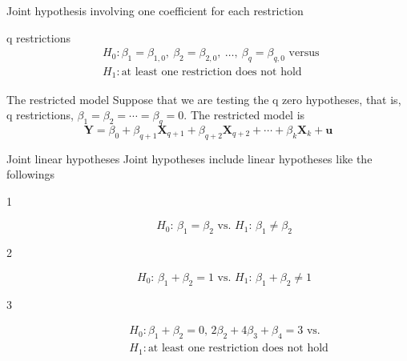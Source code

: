 \documentclass[presentation,10pt]{beamer}
\begin{document}
\begin{frame}[label={sec:org190b00f}]{Joint hypothesis involving one coefficient for each restriction}
\begin{block}{q restrictions}
\begin{align*}
&H_0: \beta_1 = \beta_{1,0},\ \beta_2 = \beta_{2,0},\ \ldots,\ \beta_q = \beta_{q,0} \text{ versus } \\
&H_1: \text{at least one restriction does not hold}
\end{align*}
\end{block}

\begin{block}{The restricted model}
Suppose that we are testing the q zero hypotheses, that is, q
restrictions, \(\beta_1 = \beta_2 = \cdots = \beta_q = 0\). The
restricted model is
\begin{equation}
\label{eq:restmodel-2}
\mathbf{Y} = \beta_0 + \beta_{q+1} \mathbf{X}_{q+1} + \beta_{q+2} \mathbf{X}_{q+2} + \cdots + \beta_k \mathbf{X}_k + \mathbf{u}
\end{equation}
\end{block}
\end{frame}

\begin{frame}[label={sec:org2e23850}]{Joint linear hypotheses}
Joint hypotheses include \alert{linear hypotheses} like the followings

\begin{description}
\item[{1}] \begin{equation*}
H_0:\, \beta_1 = \beta_2 \text{ vs. } H_1:\, \beta_1 \neq \beta_2
\end{equation*}

\item[{2}] \begin{equation*}
H_0:\, \beta_1 + \beta_2 = 1 \text{ vs. } H_1:\, \beta_1 + \beta_2 \neq 1
\end{equation*}

\item[{3}] \begin{align*}
&H_0: \beta_1 + \beta_2 = 0,\, 2\beta_2 + 4\beta_3 + \beta_4 = 3 \text{ vs. } \\
&H_1: \text{at least one restriction does not hold}
\end{align*}
\end{description}
\end{frame}
\end{document}
